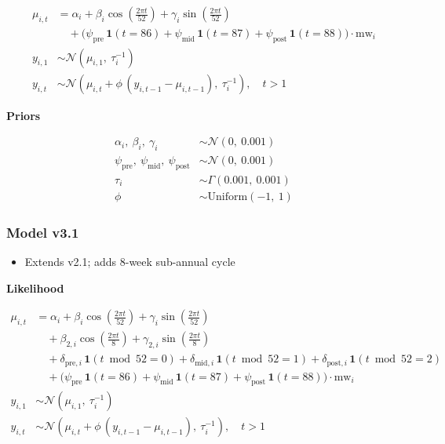 \documentclass[
]{article}
\providecommand{\tightlist}{%
  \setlength{\itemsep}{0pt}\setlength{\parskip}{0pt}}
\begin{document}
\[
\begin{aligned}
\mu_{i,t} &= \alpha_i
              + \beta_i \cos\!\left(\tfrac{2\pi t}{52}\right)
              + \gamma_i \sin\!\left(\tfrac{2\pi t}{52}\right) \\[4pt]
           &\quad + \bigl(\psi_{\text{pre}}\,\mathbf{1}(t = 86)
              + \psi_{\text{mid}}\,\mathbf{1}(t = 87)
              + \psi_{\text{post}}\,\mathbf{1}(t = 88)\bigr)\cdot\mathrm{mw}_i \\[4pt]
y_{i,1} &\sim \mathcal{N}(\mu_{i,1},\ \tau_i^{-1}) \\[4pt]
y_{i,t} &\sim \mathcal{N}\!\left(\mu_{i,t} + \phi\,(y_{i,t-1} - \mu_{i,t-1}),\ \tau_i^{-1}\right), \quad t > 1
\end{aligned}
\]

\textbf{Priors}

\[
\begin{aligned}
\alpha_i,\ \beta_i,\ \gamma_i &\sim \mathcal{N}(0,\ 0.001) \\[4pt]
\psi_{\text{pre}},\ \psi_{\text{mid}},\ \psi_{\text{post}} &\sim \mathcal{N}(0,\ 0.001) \\[4pt]
\tau_i &\sim \Gamma(0.001,\ 0.001) \\[4pt]
\phi   &\sim \mathrm{Uniform}(-1,\ 1)
\end{aligned}
\]

\subsubsection*{Model v3.1}\label{model-v3.1}

\begin{itemize}
\tightlist
\item
  Extends v2.1; adds 8-week sub-annual cycle
\end{itemize}

\textbf{Likelihood}

\[
\begin{aligned}
\mu_{i,t} &= \alpha_i
              + \beta_i \cos\!\left(\tfrac{2\pi t}{52}\right)
              + \gamma_i \sin\!\left(\tfrac{2\pi t}{52}\right) \\[4pt]
           &\quad + \beta_{2,i} \cos\!\left(\tfrac{2\pi t}{8}\right)
                  + \gamma_{2,i} \sin\!\left(\tfrac{2\pi t}{8}\right) \\[4pt]
           &\quad + \delta_{\text{pre},i}\,\mathbf{1}(t \bmod 52 = 0)
              + \delta_{\text{mid},i}\,\mathbf{1}(t \bmod 52 = 1)
              + \delta_{\text{post},i}\,\mathbf{1}(t \bmod 52 = 2) \\[4pt]
           &\quad + \bigl(\psi_{\text{pre}}\,\mathbf{1}(t = 86)
              + \psi_{\text{mid}}\,\mathbf{1}(t = 87)
              + \psi_{\text{post}}\,\mathbf{1}(t = 88)\bigr)\cdot\mathrm{mw}_i \\[4pt]
y_{i,1} &\sim \mathcal{N}(\mu_{i,1},\ \tau_i^{-1}) \\[4pt]
y_{i,t} &\sim \mathcal{N}\!\left(\mu_{i,t} + \phi\,(y_{i,t-1} - \mu_{i,t-1}),\ \tau_i^{-1}\right), \quad t > 1
\end{aligned}
\]
\end{document}
